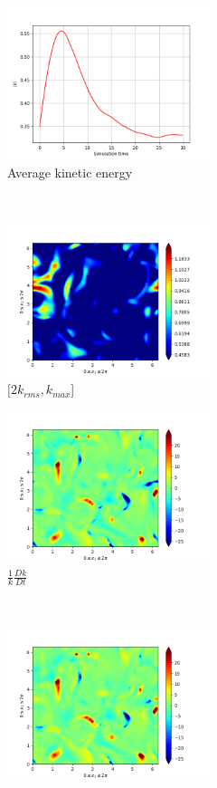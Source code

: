 \begin{figure}[H]
    \begin{subfigure}[H]{0.45\textwidth}
        \includegraphics[height=1.75in]{media/run-cds-65/ke-average1340.png}
        \caption{Average kinetic energy}
    \end{subfigure}
    ~
    \begin{subfigure}[H]{0.45\textwidth}
        \includegraphics[height=1.75in]{media/run-cds-65/ke-2-1340.png}
        \caption{$[2k_{rms}, k_{max} $] }
    \end{subfigure}
    \newline
    \begin{subfigure}[H]{0.45\textwidth}
        \includegraphics[height=1.75in]{media/run-cds-65/ke-1340.png}
        \caption{$\frac{1}{k} \frac{D k}{Dt}$}
    \end{subfigure}
    ~
    \begin{subfigure}{0.45\textwidth}
        \includegraphics[height=1.75in]{media/run-cds-65/A-ke-1340.png}

\end{subfigure}
\end{figure}
